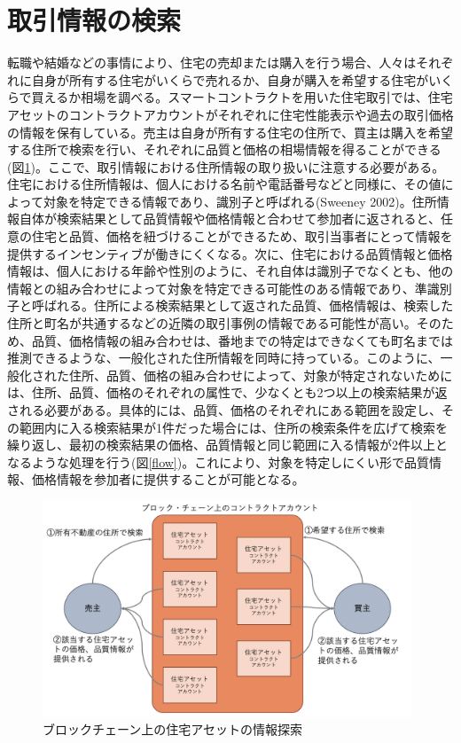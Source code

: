 \documentclass[a4paper,fontsize=11pt,report,notitlepage,line_length=38zw,number_of_lines=40,dvipdfmx]{jlreq}
\begin{document}
\section{取引情報の検索}
転職や結婚などの事情により、住宅の売却または購入を行う場合、人々はそれぞれに自身が所有する住宅がいくらで売れるか、自身が購入を希望する住宅がいくらで買えるか相場を調べる。スマートコントラクトを用いた住宅取引では、住宅アセットのコントラクトアカウントがそれぞれに住宅性能表示や過去の取引価格の情報を保有している。売主は自身が所有する住宅の住所で、買主は購入を希望する住所で検索を行い、それぞれに品質と価格の相場情報を得ることができる(図\ref{search})。ここで、取引情報における住所情報の取り扱いに注意する必要がある。住宅における住所情報は、個人における名前や電話番号などと同様に、その値によって対象を特定できる情報であり、識別子と呼ばれる(Sweeney 2002)\cite{sweeney2002b}。住所情報自体が検索結果として品質情報や価格情報と合わせて参加者に返されると、任意の住宅と品質、価格を紐づけることができるため、取引当事者にとって情報を提供するインセンティブが働きにくくなる。次に、住宅における品質情報と価格情報は、個人における年齢や性別のように、それ自体は識別子でなくとも、他の情報との組み合わせによって対象を特定できる可能性のある情報であり、準識別子と呼ばれる\cite{sweeney2002b}。住所による検索結果として返された品質、価格情報は、検索した住所と町名が共通するなどの近隣の取引事例の情報である可能性が高い。そのため、品質、価格情報の組み合わせは、番地までの特定はできなくても町名までは推測できるような、一般化された住所情報を同時に持っている。このように、一般化された住所、品質、価格の組み合わせによって、対象が特定されないためには、住所、品質、価格のそれぞれの属性で、少なくとも2つ以上の検索結果が返される必要がある\cite{sweeney2002b}。具体的には、品質、価格のそれぞれにある範囲を設定し、その範囲内に入る検索結果が1件だった場合には、住所の検索条件を広げて検索を繰り返し、最初の検索結果の価格、品質情報と同じ範囲に入る情報が2件以上となるような処理を行う(図\ref{flow})。これにより、対象を特定しにくい形で品質情報、価格情報を参加者に提供することが可能となる。

\begin{figure}
 \centering
 \includegraphics[width=11cm]{search.png}
 \caption{ブロックチェーン上の住宅アセットの情報探索}
 \label{search}
\end{figure}
\end{document}
